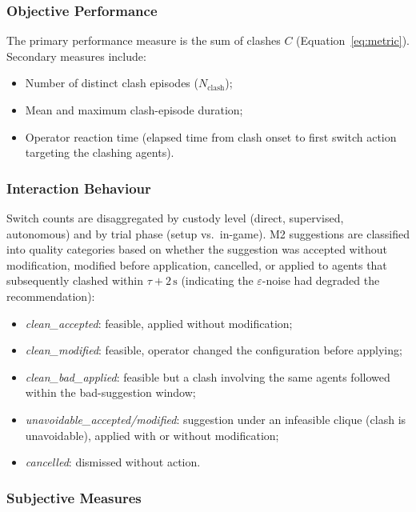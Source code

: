 \documentclass[10pt]{article}
\theoremstyle{definition}
\begin{document}
\subsubsection{Objective Performance}

The primary performance measure is the sum of clashes $C$ (Equation~\ref{eq:metric}). Secondary measures include:
\begin{itemize}[noitemsep]
  \item Number of distinct clash episodes ($N_{\mathrm{clash}}$);
  \item Mean and maximum clash-episode duration;
  \item Operator reaction time (elapsed time from clash onset to first switch action targeting the clashing agents).
\end{itemize}

\subsubsection{Interaction Behaviour}

Switch counts are disaggregated by custody level (direct, supervised, autonomous) and by trial phase (setup vs.\ in-game). M2 suggestions are classified into quality categories based on whether the suggestion was accepted without modification, modified before application, cancelled, or applied to agents that subsequently clashed within $\tau + 2\,\mathrm{s}$ (indicating the $\varepsilon$-noise had degraded the recommendation):
\begin{itemize}[noitemsep]
  \item \textit{clean\_accepted}: feasible, applied without modification;
  \item \textit{clean\_modified}: feasible, operator changed the configuration before applying;
  \item \textit{clean\_bad\_applied}: feasible but a clash involving the same agents followed within the bad-suggestion window;
  \item \textit{unavoidable\_accepted/modified}: suggestion under an infeasible clique (clash is unavoidable), applied with or without modification;
  \item \textit{cancelled}: dismissed without action.
\end{itemize}

\subsubsection{Subjective Measures}
\end{document}
